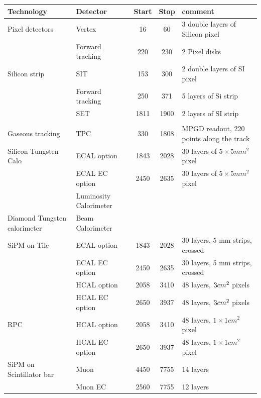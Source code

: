 \documentclass[%
 amsmath,amssymb,
 aps,
]{revtex4-1}
\renewcommand{\toprule}{\hline}
\newcommand{\midrule}{\hline}
\begin{document}
\begin{table}[th]
    \centering
    \begin{tabular}{|l|l|c|c|p{4cm}|}
    \toprule
        Technology & Detector & Start   & Stop & comment \\
        \midrule
Pixel detectors & Vertex & 16   & 60   & 3 double layers of Silicon pixel \\
& Forward tracking  & 220 & 230 & 2 Pixel disks \\
\midrule
Silicon strip   & SIT    & 153  & 300  & 2 double layers of SI pixel            \\
& Forward tracking  & 250 & 371 & 5 layers of Si strip\\
                & SET    & 1811 & 1900 & 2 layers of SI strip           \\
                & & & & \\
Gaseous tracking & TPC & 330 & 1808 & MPGD readout, 220 points along the track\\
\midrule
Silicon Tungsten Calo & ECAL option& 1843 & 2028 & 30 layers of $5\times5 mm^2$ pixel \\
& ECAL EC option & 2450 & 2635 & 30 layers of $5\times5 mm^2$ pixel \\
& Luminosity Calorimeter & & & \\
\midrule
Diamond Tungsten calorimeter & Beam Calorimeter & &&\\
\midrule
SiPM on Tile & ECAL option   & 1843 & 2028 & 30 layers, 5 mm strips, crossed\\
& ECAL EC option& 2450 & 2635 & 30 layers, 5 mm strips, crossed\\
             & HCAL option   & 2058 & 3410 & 48 layers, $3\time3 cm^2$ pixels\\
             & HCAL EC option& 2650 & 3937 & 48 layers, $3\time3 cm^2$ pixels\\
\midrule
RPC          & HCAL option   & 2058 & 3410 & 48 layers, $1 \times 1 cm^2$ pixel \\
& HCAL EC option & 2650 & 3937 & 48 layers, $1 \times 1 cm^2$ pixel\\
\midrule
SiPM on Scintillator bar & Muon & 4450 & 7755 & 14 layers \\
& Muon EC & 2560 & 7755 & 12 layers \\


\end{tabular}
\end{table}
\end{document}
